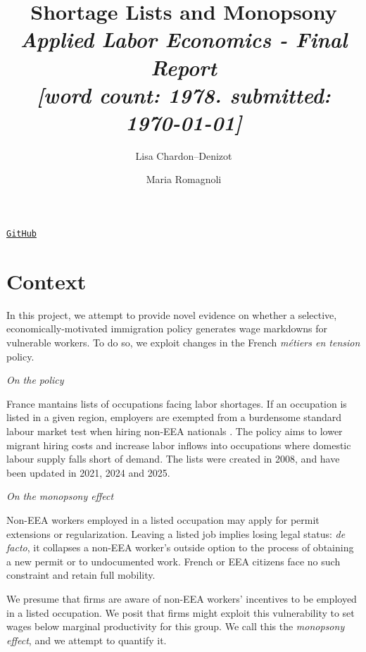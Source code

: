 \documentclass[10pt, a4paper]{article}
\title{\textbf{Shortage Lists and Monopsony}\\[0.2em]
\large \textit{Applied Labor Economics - Final Report} \\ [0.2em]
\small{\textit{[word count: 1978. submitted: \today]}}}
\author{Lisa Chardon--Denizot \and Maria Romagnoli}
\date{}
\begin{document}
\maketitle
\begin{center}
\vspace{-0.6em}
\href{https://github.com/mariaromagnoli/chardon-romagnoli-submission}{\texttt{GitHub}}
\end{center}
\vspace{0.2em}


\section{Context}
\medskip
\noindent In this project, we attempt to provide novel evidence on whether a selective, economically-motivated immigration policy generates wage markdowns for vulnerable workers. To do so, we exploit changes in the French \textit{métiers en tension} policy.  

\medskip
\noindent \textit{On the policy}

\noindent France mantains lists of occupations facing labor shortages. If an occupation is listed in a given region, employers are exempted from a burdensome standard labour market test when hiring non-EEA nationals \citep{ParFr2025}. The policy aims to lower migrant hiring costs and increase labor inflows into occupations where domestic labour supply falls short of demand. The lists were created in 2008, and have been updated in 2021, 2024 and 2025. 
\medskip

\noindent \textit{On the monopsony effect}

\noindent Non-EEA workers employed in a listed occupation may apply for permit extensions or regularization. Leaving a listed job implies losing legal status: \textit{de facto}, it collapses a non-EEA worker's outside option to the process of obtaining a new permit or to undocumented work. French or EEA citizens face no such constraint and retain full mobility. 

\noindent We presume that firms are aware of non-EEA workers' incentives to be employed in a listed occupation. We posit that firms might exploit this vulnerability to set wages below marginal productivity for this group. We call this the \textit{monopsony effect}, and we attempt to quantify it. 
\end{document}
